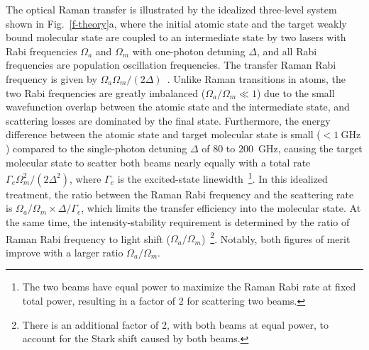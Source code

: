 \documentclass[aps,prl,twocolumn,10pt,superscriptaddress]{revtex4-1}
\begin{document}
The optical Raman transfer is illustrated
by the idealized three-level system shown in Fig.~\ref{f-theory}a,
where the initial atomic state and the target weakly bound molecular state are coupled to an intermediate state by two lasers with Rabi frequencies $\Omega_a$ and $\Omega_m$ with one-photon detuning $ \Delta $, and all Rabi frequencies are population oscillation frequencies.  %
The transfer Raman Rabi frequency is given by $\Omega_a\Omega_m / (2\Delta)$~\cite{Wineland2003}.
Unlike Raman transitions in atoms, the two Rabi frequencies are greatly imbalanced ($\Omega_a/\Omega_m \ll 1$) %
due to the small wavefunction overlap between the atomic state and the intermediate state, %
and scattering losses are dominated by the final state. Furthermore, the energy difference between the atomic state and target molecular state is small ($ < 1~\mathrm{GHz} $) compared to the single-photon detuning $ \Delta $ of $80$ to $200$~GHz, causing the target molecular state to scatter both beams nearly equally with a total rate $ \Gamma_e \Omega_m^2 / (2\Delta^2)$, where $ \Gamma_e $ is the excited-state linewidth~\footnote{The two beams have equal power to maximize the Raman Rabi rate at fixed total power, resulting in a factor of 2 for scattering two beams.}.
In this idealized treatment, the ratio between the Raman Rabi frequency and the scattering rate is $ \Omega_a/\Omega_m \times \Delta/\Gamma_e $, which limits the transfer efficiency into the molecular state. At the same time, the intensity-stability requirement is determined by the ratio of Raman Rabi frequency to light shift ($\Omega_a/\Omega_m$)~\footnote{There is an additional factor of 2, with both beams at equal power,
  to account for the Stark shift caused by both beams.}. Notably, both figures of merit improve with a larger ratio $\Omega_a/\Omega_m$. %
\end{document}
